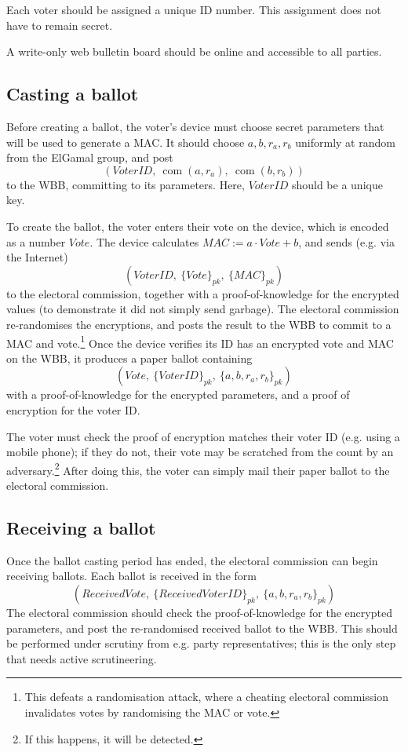 \documentclass[11pt,twoside,a4paper]{article}
\DeclareMathOperator{\com}{com}
\theoremstyle{definition}
\begin{document}
Each voter should be assigned a unique ID number. This assignment does not have to remain secret.

A write-only web bulletin board should be online and accessible to all parties.
\subsection{Casting a ballot}
Before creating a ballot, the voter's device must choose secret parameters that will be used to generate a MAC. It should choose \(a,b,r_a,r_b\) uniformly at random from the ElGamal group, and post
\[(VoterID,\ \com(a,r_a),\ \com(b,r_b))\]
to the WBB, committing to its parameters. Here, \(VoterID\) should be a unique key.

To create the ballot, the voter enters their vote on the device, which is encoded as a number \(Vote\). The device calculates \(MAC:=a\cdot Vote+b\), and sends (e.g. via the Internet)
\[(VoterID,\ \{Vote\}_{pk},\ \{MAC\}_{pk})\]
to the electoral commission, together with a proof-of-knowledge for the encrypted values (to demonstrate it did not simply send garbage). The electoral commission re-randomises the encryptions, and posts the result to the WBB to commit to a MAC and vote.\footnote{This defeats a randomisation attack, where a cheating electoral commission invalidates votes by randomising the MAC or vote.} Once the device verifies its ID has an encrypted vote and MAC on the WBB, it produces a paper ballot containing
\[(Vote,\ \{VoterID\}_{pk},\ \{a,b,r_a,r_b\}_{pk})\]
with a proof-of-knowledge for the encrypted parameters, and a proof of encryption for the voter ID.

The voter must check the proof of encryption matches their voter ID (e.g. using a mobile phone); if they do not, their vote may be scratched from the count by an adversary.\footnote{If this happens, it will be detected.} After doing this, the voter can simply mail their paper ballot to the electoral commission.
\subsection{Receiving a ballot}
Once the ballot casting period has ended, the electoral commission can begin receiving ballots. Each ballot is received in the form
\[(ReceivedVote,\ \{ReceivedVoterID\}_{pk},\ \{a,b,r_a,r_b\}_{pk})\]
The electoral commission should check the proof-of-knowledge for the encrypted parameters, and post the re-randomised received ballot to the WBB. This should be performed under scrutiny from e.g. party representatives; this is the only step that needs active scrutineering.
\end{document}
